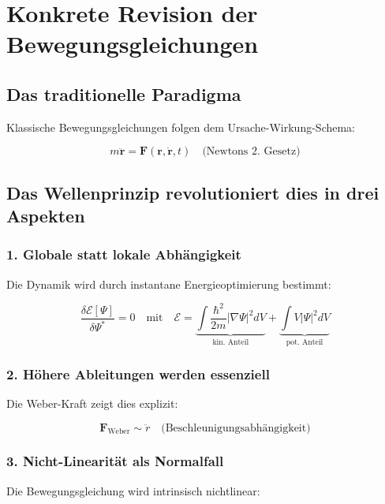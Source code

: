 \section{Konkrete Revision der Bewegungsgleichungen}
\label{sec:revision_bewegungsgleichungen}

\subsection{Das traditionelle Paradigma}
Klassische Bewegungsgleichungen folgen dem Ursache-Wirkung-Schema:

\begin{equation}
    m\ddot{\mathbf{r}} = \mathbf{F}(\mathbf{r},\dot{\mathbf{r}},t) \quad \text{(Newtons 2. Gesetz)}
\end{equation}

\subsection{Das Wellenprinzip revolutioniert dies in drei Aspekten}

\subsubsection{1. Globale statt lokale Abhängigkeit}
Die Dynamik wird durch instantane Energieoptimierung bestimmt:

\begin{equation}
    \frac{\delta \mathcal{E}[\Psi]}{\delta \Psi^*} = 0 \quad \text{mit} \quad 
    \mathcal{E} = \underbrace{\int \frac{\hbar^2}{2m}|\nabla\Psi|^2 dV}_{\text{kin. Anteil}} + \underbrace{\int V|\Psi|^2 dV}_{\text{pot. Anteil}}
\end{equation}

\subsubsection{2. Höhere Ableitungen werden essenziell}
Die Weber-Kraft zeigt dies explizit:

\begin{equation}
    \mathbf{F}_{\text{Weber}} \sim \ddot{r} \quad \text{(Beschleunigungsabhängigkeit)}
\end{equation}

\subsubsection{3. Nicht-Linearität als Normalfall}
Die Bewegungsgleichung wird intrinsisch nichtlinear:

